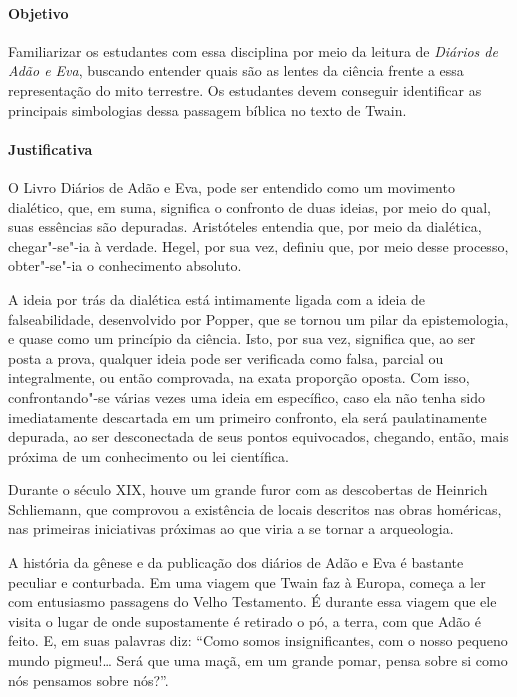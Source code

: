 \documentclass[12pt]{extarticle}
\begin{document}
\paragraph{Objetivo} Familiarizar os estudantes com essa disciplina por meio da leitura 
de \emph{Diários de Adão e Eva}, buscando entender quais são as lentes da ciência frente a 
essa representação do mito terrestre. Os estudantes devem conseguir identificar as principais 
simbologias dessa passagem bíblica no texto de Twain.

\paragraph{Justificativa} O Livro Diários de Adão e Eva, pode ser entendido como um
movimento dialético, que, em suma, significa o confronto de duas ideias,
por meio do qual, suas essências são depuradas. Aristóteles entendia
que, por meio da dialética, chegar"-se"-ia à verdade. Hegel, por sua vez,
definiu que, por meio desse processo, obter"-se"-ia o conhecimento
absoluto. 

A ideia por trás da dialética está intimamente ligada com a
ideia de falseabilidade, desenvolvido por Popper, que se tornou um pilar
da epistemologia, e quase como um princípio da ciência. Isto, por sua
vez, significa que, ao ser posta a prova, qualquer ideia pode ser
verificada como falsa, parcial ou integralmente, ou então comprovada, na
exata proporção oposta. Com isso, confrontando"-se várias vezes uma ideia
em específico, caso ela não tenha sido imediatamente descartada em um
primeiro confronto, ela será paulatinamente depurada, ao ser
desconectada de seus pontos equivocados, chegando, então, mais próxima
de um conhecimento ou lei científica.

Durante o século XIX, houve um grande furor com as descobertas de
Heinrich Schliemann, que comprovou a existência de locais descritos nas
obras homéricas, nas primeiras iniciativas próximas ao que viria a se
tornar a arqueologia. 

A história da gênese e da publicação dos diários de Adão
e Eva é bastante peculiar e conturbada. Em uma viagem que Twain faz à Europa, começa a 
ler com entusiasmo passagens do Velho Testamento. É durante essa viagem que ele visita 
o lugar de onde supostamente é retirado o pó, a terra, com que Adão é feito. E, em suas 
palavras diz: ``Como somos insignificantes, com o nosso pequeno mundo pigmeu!{}\ldots{} 
Será que uma maçã, em um grande pomar, pensa sobre si como nós pensamos sobre nós?''.
\end{document}
